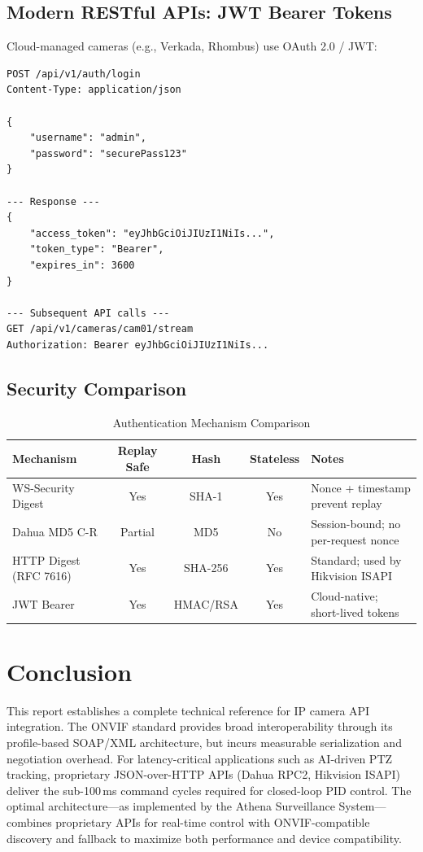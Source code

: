 \documentclass[12pt,a4paper]{article}
\begin{document}
\subsection{Modern RESTful APIs: JWT Bearer Tokens}
Cloud-managed cameras (e.g., Verkada, Rhombus) use OAuth 2.0 / JWT:
\begin{lstlisting}[style=jsonstyle, caption=JWT Authentication Flow]
POST /api/v1/auth/login
Content-Type: application/json

{
    "username": "admin",
    "password": "securePass123"
}

--- Response ---
{
    "access_token": "eyJhbGciOiJIUzI1NiIs...",
    "token_type": "Bearer",
    "expires_in": 3600
}

--- Subsequent API calls ---
GET /api/v1/cameras/cam01/stream
Authorization: Bearer eyJhbGciOiJIUzI1NiIs...
\end{lstlisting}

\subsection{Security Comparison}
\begin{table}[h!]
\centering
\caption{Authentication Mechanism Comparison}
\begin{tabularx}{\textwidth}{l c c c X}
\toprule
\textbf{Mechanism} & \textbf{Replay Safe} & \textbf{Hash} & \textbf{Stateless} & \textbf{Notes} \\
\midrule
WS-Security Digest & Yes & SHA-1 & Yes & Nonce + timestamp prevent replay \\
Dahua MD5 C-R & Partial & MD5 & No & Session-bound; no per-request nonce \\
HTTP Digest (RFC 7616) & Yes & SHA-256 & Yes & Standard; used by Hikvision ISAPI \\
JWT Bearer & Yes & HMAC/RSA & Yes & Cloud-native; short-lived tokens \\
\bottomrule
\end{tabularx}
\end{table}


\section{Conclusion}
This report establishes a complete technical reference for IP camera API integration. The ONVIF standard provides broad interoperability through its profile-based SOAP/XML architecture, but incurs measurable serialization and negotiation overhead. For latency-critical applications such as AI-driven PTZ tracking, proprietary JSON-over-HTTP APIs (Dahua RPC2, Hikvision ISAPI) deliver the sub-100\,ms command cycles required for closed-loop PID control. The optimal architecture---as implemented by the Athena Surveillance System---combines proprietary APIs for real-time control with ONVIF-compatible discovery and fallback to maximize both performance and device compatibility.
\end{document}
